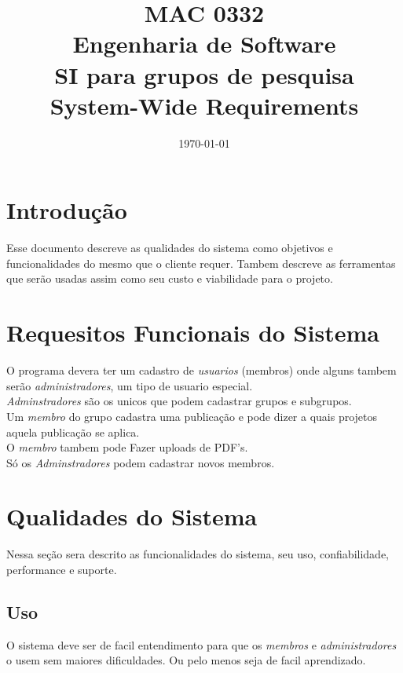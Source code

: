 \documentclass[11pt, a4paper]{article}
\title{MAC 0332\\
	Engenharia de Software\\
	SI para grupos de pesquisa\\
	System-Wide Requirements}
\date{\today}
\begin{document}
	\maketitle
	\newpage
	
	\section{Introdução}
		Esse documento descreve as qualidades do sistema como objetivos e 
		funcionalidades do mesmo que o cliente requer. Tambem descreve as 
		ferramentas que serão usadas assim como seu custo e viabilidade para 
		o projeto. 
	\section{Requesitos Funcionais do Sistema}
		O programa devera ter um cadastro de \textit{usuarios} (membros) onde 
		\indent alguns tambem serão \textit{administradores}, um tipo de usuario 
		especial.\\
		\indent \textit{Adminstradores} são os unicos que podem cadastrar 
		grupos e subgrupos.\\
		\indent Um \textit{membro} do grupo cadastra uma publicação e pode 
		dizer a quais projetos aquela publicação se aplica.\\
		\indent O \textit{membro} tambem pode Fazer uploads de PDF's.\\
		\indent Só os \textit{Adminstradores} podem cadastrar novos membros.
		
	\section{Qualidades do Sistema}
		Nessa seção sera descrito as funcionalidades do sistema, seu uso, 
		confiabilidade, performance e suporte.
		
		\subsection{Uso}
			O sistema deve ser de facil entendimento para que os 
			\textit{membros} e \textit{administradores} o usem sem maiores 
			dificuldades. Ou pelo menos seja de facil aprendizado.
		
\end{document}

